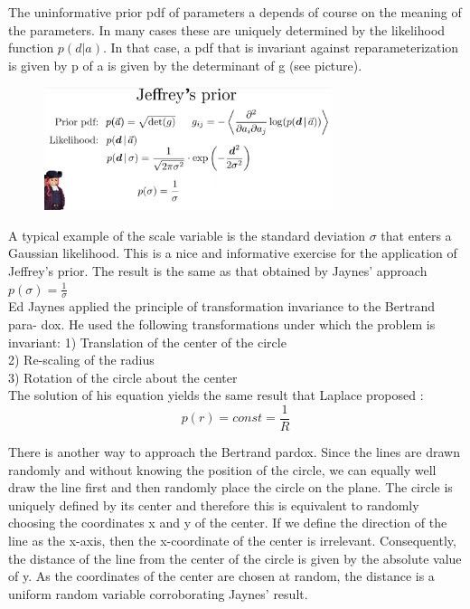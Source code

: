 \documentclass[12pt, a4paper]{scrartcl}
\begin{document}
The uninformative prior pdf of parameters a depends of course on the
meaning of the parameters. In many cases these are uniquely determined
by the likelihood function $p(d|a)$. In that case, a pdf that is invariant against reparameterization is given by p of a is given by the determinant of g (see picture).%
 \begin{figure}[H]
	\centering
	\includegraphics[width=0.75\textwidth]{8_9.png}
\end{figure}

A typical example of the scale variable is the standard deviation $\sigma$ that enters
a Gaussian likelihood. This is a nice and informative exercise for the application of Jeﬀrey’s prior. The result is the same as that obtained by Jaynes’
approach $p(\sigma)=\frac{1}{\sigma}$\\

Ed Jaynes applied the principle of transformation invariance to the Bertrand para-
dox.
He used the following transformations under which the problem is invariant:%
1) Translation of the center of the circle\\
2) Re-scaling of the radius\\
3) Rotation of the circle about the center\\%
The solution of his equation yields the same result that Laplace proposed :\\
\[p(r)=const=\frac 1R\]

There is another way to approach the Bertrand pardox. Since the lines
are drawn randomly and without knowing the position of the circle, we can
equally well draw the line ﬁrst and then randomly place the circle on the
plane. The circle is uniquely deﬁned by its center and therefore this is equivalent to randomly choosing the coordinates x and y of the center. If we deﬁne
the direction of the line as the x-axis, then the x-coordinate of the center is
irrelevant. Consequently, the distance of the line from the center of the circle is given by the absolute value of y. As the coordinates of the center are
chosen at random, the distance is a uniform random variable corroborating
Jaynes’ result.\\%
\end{document}
